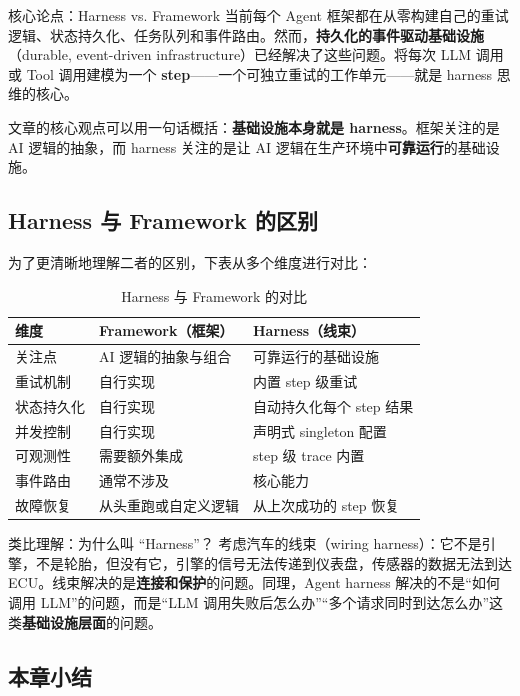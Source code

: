 \documentclass[a4paper]{article}
\begin{document}
\begin{importantbox}{核心论点：Harness vs. Framework}
当前每个 Agent 框架都在从零构建自己的重试逻辑、状态持久化、任务队列和事件路由。然而，\textbf{持久化的事件驱动基础设施}（durable, event-driven infrastructure）已经解决了这些问题。将每次 LLM 调用或 Tool 调用建模为一个 \textbf{step}——一个可独立重试的工作单元——就是 harness 思维的核心。
\end{importantbox}

文章的核心观点可以用一句话概括：\textbf{基础设施本身就是 harness}。框架关注的是 AI 逻辑的抽象，而 harness 关注的是让 AI 逻辑在生产环境中\textbf{可靠运行}的基础设施。

\subsection{Harness 与 Framework 的区别}

为了更清晰地理解二者的区别，下表从多个维度进行对比：

\begin{table}[H]
\centering
\caption{Harness 与 Framework 的对比}
\begin{tabular}{lll}
\toprule
\textbf{维度} & \textbf{Framework（框架）} & \textbf{Harness（线束）} \\
\midrule
关注点 & AI 逻辑的抽象与组合 & 可靠运行的基础设施 \\
重试机制 & 自行实现 & 内置 step 级重试 \\
状态持久化 & 自行实现 & 自动持久化每个 step 结果 \\
并发控制 & 自行实现 & 声明式 singleton 配置 \\
可观测性 & 需要额外集成 & step 级 trace 内置 \\
事件路由 & 通常不涉及 & 核心能力 \\
故障恢复 & 从头重跑或自定义逻辑 & 从上次成功的 step 恢复 \\
\bottomrule
\end{tabular}
\end{table}

\begin{knowledgebox}{类比理解：为什么叫 ``Harness''？}
考虑汽车的线束（wiring harness）：它不是引擎，不是轮胎，但没有它，引擎的信号无法传递到仪表盘，传感器的数据无法到达 ECU。线束解决的是\textbf{连接和保护}的问题。同理，Agent harness 解决的不是``如何调用 LLM''的问题，而是``LLM 调用失败后怎么办''``多个请求同时到达怎么办''这类\textbf{基础设施层面}的问题。
\end{knowledgebox}

\subsection{本章小结}
\end{document}

